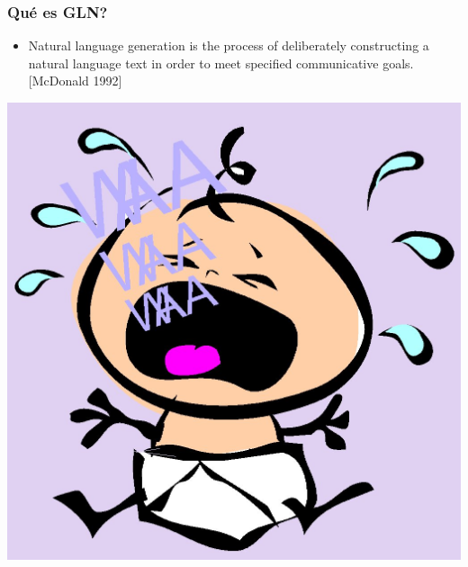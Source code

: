 \documentclass[compress,color=usenames]{beamer}
\begin{document}
\begin{frame}
\frametitle{Qu\'e es GLN?}

\begin{itemize}
\item { {Natural language generation is the process of deliberately constructing a natural language text in order to meet specified communicative goals.}}\\

\hfill [McDonald 1992]\pause
\end{itemize}

\hfill\includegraphics[scale=.1]{pics/crybaby.jpg}

\end{frame}
\end{document}
